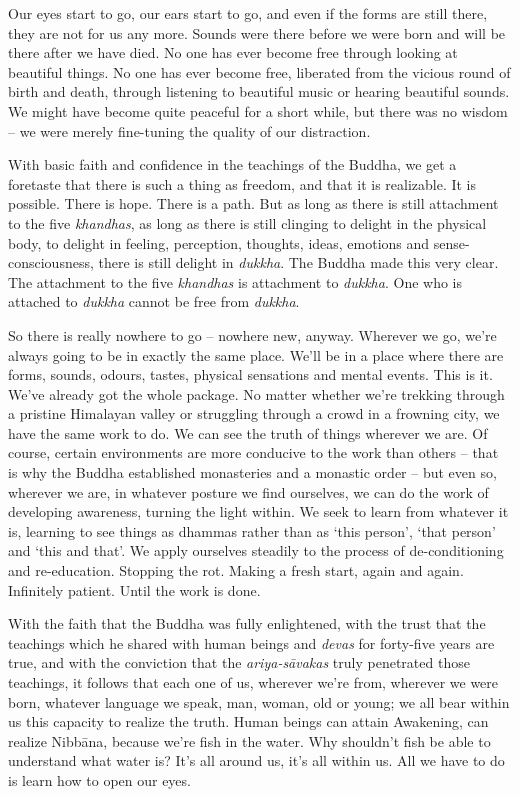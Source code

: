 Our eyes start to go, our ears start to go, and even if the forms are
still there, they are not for us any more. Sounds were there before we
were born and will be there after we have died. No one has ever become
free through looking at beautiful things. No one has ever become free, 
liberated from the vicious round of birth and death, through listening
to beautiful music or hearing beautiful sounds. We might have become
quite peaceful for a short while, but there was no wisdom -- we were
merely fine-tuning the quality of our distraction. 

With basic faith and confidence in the teachings of the Buddha, we get a
foretaste that there is such a thing as freedom, and that it is
realizable. It is possible. There is hope. There is a path. But as long
as there is still attachment to the five \emph{khandhas}, as long as
there is still clinging to delight in the physical body, to delight in
feeling, perception, thoughts, ideas, emotions and sense-consciousness, 
there is still delight in \emph{dukkha}. The Buddha made this very
clear. The attachment to the five \emph{khandhas} is attachment to
\emph{dukkha}. One who is attached to \emph{dukkha} cannot be free from
\emph{dukkha}. 

So there is really nowhere to go -- nowhere new, anyway. Wherever we
go, we're always going to be in exactly the same place. We'll be in a
place where there are forms, sounds, odours, tastes, physical sensations
and mental events. This is it. We've already got the whole package. No
matter whether we're trekking through a pristine Himalayan valley or
struggling through a crowd in a frowning city, we have the same work to
do. We can see the truth of things wherever we are. Of course, certain
environments are more conducive to the work than others -- that is why
the Buddha established monasteries and a monastic order -- but even so, 
wherever we are, in whatever posture we find ourselves, we can do the
work of developing awareness, turning the light within. We seek to learn
from whatever it is, learning to see things as dhammas rather than as
`this person', `that person' and `this and that'. We apply ourselves
steadily to the process of de-conditioning and re-education. Stopping
the rot. Making a fresh start, again and again. Infinitely patient. 
Until the work is done. 

With the faith that the Buddha was fully enlightened, with the trust
that the teachings which he shared with human beings and \emph{devas}
for forty-five years are true, and with the conviction that the
\emph{ariya-sāvakas} truly penetrated those teachings, it follows that
each one of us, wherever we're from, wherever we were born, whatever
language we speak, man, woman, old or young; we all bear within us this
capacity to realize the truth. Human beings can attain Awakening, can
realize Nibbāna, because we're fish in the water. Why shouldn't fish be
able to understand what water is? It's all around us, it's all within
us. All we have to do is learn how to open our eyes. 

